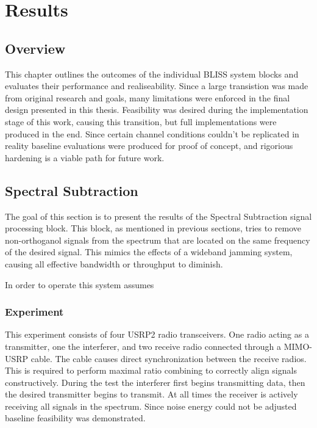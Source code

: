 \chapter{Results}
\label{ch:results}

\section{Overview}

This chapter outlines the outcomes of the individual BLISS system blocks and evaluates their performance and realiseability.  Since a large transistion was made from original research and goals, many limitations were enforced in the final design presented in this thesis.  Feasibility was desired during the implementation stage of this work, causing this transition, but full implementations were produced in the end.  Since certain channel conditions couldn't be replicated in reality baseline evaluations were produced for proof of concept, and rigorious hardening is a viable path for future work.\\ 

\section{Spectral Subtraction}

The goal of this section is to present the results of the Spectral Subtraction signal processing block.  This block, as mentioned in previous sections, tries to remove non-orthoganol signals from the spectrum that are located on the same frequency of the desired signal.  This mimics the effects of a wideband jamming system, causing all effective bandwidth or throughput to diminish.  

In order to operate this system assumes

\subsection{Experiment}

This experiment consists of four USRP2 radio transceivers.  One radio acting as a transmitter, one the interferer, and two receive radio connected through a MIMO-USRP cable.  The cable causes direct synchronization between the receive radios.  This is required to perform maximal ratio combining to correctly align signals constructively.  During the test the interferer first begins transmitting data, then the desired transmitter begins to transmit.  At all times the receiver is actively receiving all signals in the spectrum.  Since noise energy could not be adjusted baseline feasibility was demonstrated.\\

